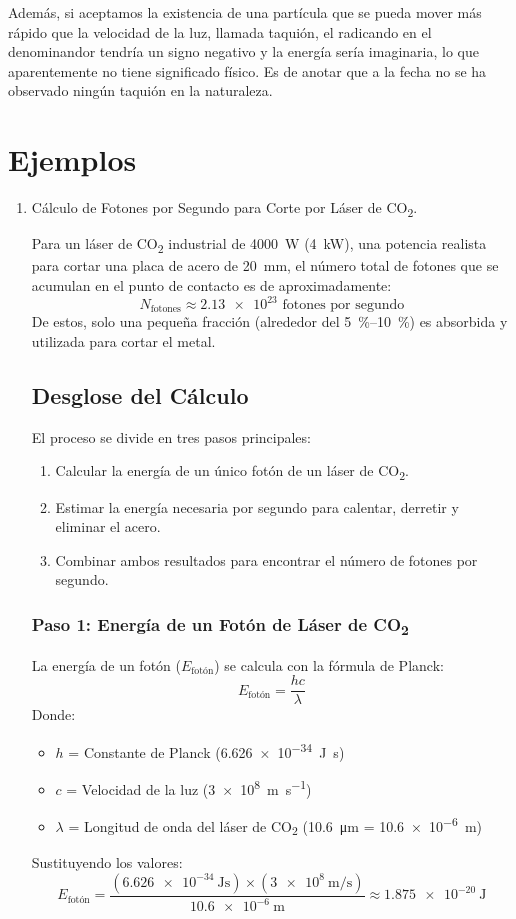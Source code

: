 \documentclass[11pt,a4paper]{article}
\begin{document}
Además, si aceptamos la existencia de una partícula que se pueda mover más rápido que la velocidad de la luz, llamada taquión, el radicando en el denominandor tendría un signo negativo y la energía sería imaginaria, lo que aparentemente no tiene significado físico. Es de anotar que a la fecha no se ha observado ningún taquión en la naturaleza.

\section{Ejemplos}
\begin{enumerate}
    \item Cálculo de Fotones por Segundo para Corte por Láser de CO\textsubscript{2}.

Para un láser de CO\textsubscript{2} industrial de \SI{4000}{\watt} (\SI{4}{kW}), una potencia realista para cortar una placa de acero de \SI{20}{\milli\meter}, el número total de fotones que se acumulan en el punto de contacto es de aproximadamente:
\[ \boxed{N_{\text{fotones}} \approx \num{2.13e23} \text{ fotones por segundo}} \]
De estos, solo una pequeña fracción (alrededor del \SIrange{5}{10}{\percent}) es absorbida y utilizada para cortar el metal.

\subsection*{Desglose del Cálculo}
El proceso se divide en tres pasos principales:
\begin{enumerate}
    \item Calcular la energía de un único fotón de un láser de CO\textsubscript{2}.
    \item Estimar la energía necesaria por segundo para calentar, derretir y eliminar el acero.
    \item Combinar ambos resultados para encontrar el número de fotones por segundo.
\end{enumerate}

\subsubsection*{Paso 1: Energía de un Fotón de Láser de CO\textsubscript{2}}
La energía de un fotón ($E_{\text{fotón}}$) se calcula con la fórmula de Planck:
\[ E_{\text{fotón}} = \frac{hc}{\lambda} \]
Donde:
\begin{itemize}
    \item $h$ = Constante de Planck (\SI{6.626e-34}{\joule\second})
    \item $c$ = Velocidad de la luz (\SI{3e8}{\meter\per\second})
    \item $\lambda$ = Longitud de onda del láser de CO\textsubscript{2} (\SI{10.6}{\micro\meter} = \SI{10.6e-6}{\meter})
\end{itemize}
Sustituyendo los valores:
\[ E_{\text{fotón}} = \frac{(\SI{6.626e-34}{\joule\second}) \times (\SI{3e8}{\meter\per\second})}{\SI{10.6e-6}{\meter}} \approx \SI{1.875e-20}{\joule} \]


\end{enumerate}
\end{document}
